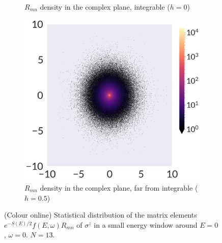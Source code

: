 \begin{figure}
\begin{subfigure}[b]{0.22\textwidth}
\caption{$R_{mn}$ density in the complex plane, integrable ($h=0$)}
\end{subfigure}%
\begin{subfigure}[b]{0.22\textwidth}
	\centering
\includegraphics[width=\columnwidth]{figures/chapter1/sigmaz05-2ddist-hist.png}
\caption{$R_{mn}$ density in the complex plane, far from integrable ($h=0.5$)}
\end{subfigure} 
\caption{(Colour online) Statistical distribution of the matrix elements $e^{-S(E)/2} f(E,\omega) R_{mn}$ of $\sigma^z$ in a small energy window around $E=0$, $\omega=0$. $N=13$.}
\label{fig:stats-sigma}
\end{figure}

